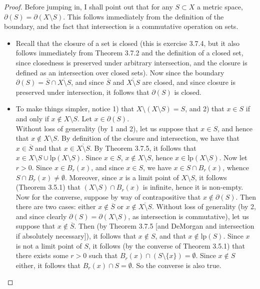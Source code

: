 \documentclass[11pt]{article}
\theoremstyle{definition}
\begin{document}
\begin{proof}


Before jumping in, I shall point out that for any $S\subset X$ a metric space,  $\partial(S) = \partial(X\setminus S)$. This follows immediately from the definition of the boundary, and the fact that intersection is a commutative operation on sets.
\begin{itemize}
\item

Recall that the closure of a set is closed (this is exercise 3.7.4, but it also follows immediately from Theorem 3.7.2 and the definition of a closed set, since closedness is preserved under arbitrary intersection, and the closure is defined as an intersection over closed sets). Now since the boundary $\partial(S) = \overline{S}\cap \overline{X\setminus S}$, and since $\overline{S}$ and $\overline{X\setminus S}$ are closed, and since closure is preserved under intersection, it follows that $\partial(S)$ is closed.

\item 

To make things simpler, notice 1) that $X\setminus (X\setminus S) = S$, and 2) that $x\in S$ if and only if $x\not\in X\setminus S$. Let $x\in \partial(S)$.\\

Without loss of generality (by 1 and 2), let us suppose that $x\in S$, and hence that $x\not\in X\setminus S$. By definition of the closure and intersection, we have that $x\in \overline{S}$ and that $x\in \overline{X\setminus S}$. By Theorem 3.7.5, it follows that $x\in X\setminus S \cup \mbox{lp}(X\setminus S)$. Since $x\in S$, $x\not\in X\setminus S$, hence $x\in \mbox{lp}(X\setminus S)$. Now let $r>0$. Since $x\in B_r(x)$, and since $x\in S$, we have $x\in S\cap B_r(x)$, whence $S\cap B_r(x) \ne \emptyset$. Moreover, since $x$ is a limit point of $X\setminus S$, it follows (Theorem 3.5.1) that $(X\setminus S)\cap B_r(x)$ is infinite, hence it is non-empty.\\

Now for the converse, suppose by way of contrapositive that $x\not\in \partial(S)$. Then there are two cases: either $x\not\in \overline{S}$ or $x\not\in \overline{X\setminus S}$. Without loss of generality (by 2, and since clearly $\partial(S) = \partial(X\setminus S)$, as intersection is commutative), let us suppose that $x\not\in \overline{S}$. Then (by Theorem 3.7.5 [and DeMorgan and intersection if absolutely necessary]), it follows that $x\not\in S$, and that $x\not\in \mbox{lp}(S)$. Since $x$ is not a limit point of $S$, it follows (by the converse of Theorem 3.5.1) that there exists some $r>0$ such that $B_r(x) \cap (S\setminus \{x\})  = \emptyset$. Since $x\not\in S$ either, it follows that $B_r(x) \cap S= \emptyset$. So the converse is also true.


\end{itemize}
\end{proof}
\end{document}
